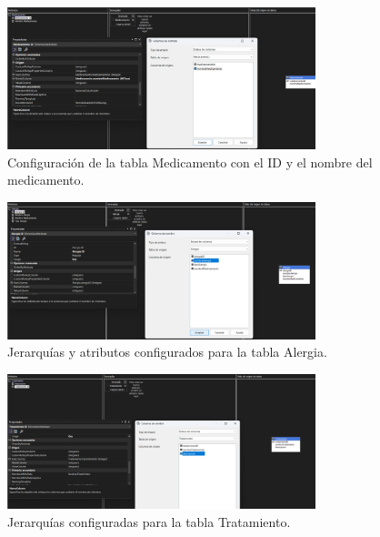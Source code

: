\documentclass{article}
\begin{document}
\begin{figure}[H]
	\begin{center}
		\includegraphics[width=0.8\textwidth]{images/medicamento_dim.png}
		\caption{Configuración de la tabla Medicamento con el ID y el nombre del medicamento.}
		\label{fig:medicamento_dim}
	\end{center}
\end{figure}

\begin{figure}[H]
	\begin{center}
		\includegraphics[width=0.8\textwidth]{images/alergia_dim.png}
		\caption{Jerarquías y atributos configurados para la tabla Alergia.}
		\label{fig:alergia_dim}
	\end{center}
\end{figure}

\begin{figure}[H]
	\begin{center}
		\includegraphics[width=0.8\textwidth]{images/tratamiento_dim.png}
		\caption{Jerarquías configuradas para la tabla Tratamiento.}
		\label{fig:tratamiento_dim}
	\end{center}
\end{figure}
\end{document}
